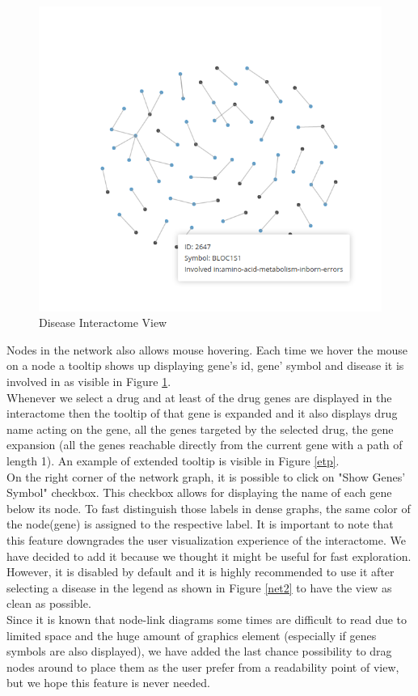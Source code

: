 \documentclass[12pt,twocolumn,twoside]{article}
\begin{document}
	\begin{figure}
		\includegraphics[width=.75\linewidth]{network.png}
		\caption{Disease Interactome View}
		\label{net}
	\end{figure}
	Nodes in the network also allows mouse hovering. Each time we hover the mouse on a node a tooltip shows up displaying gene's id, gene' symbol and disease it is involved in as visible in Figure \ref{net}.\\ Whenever we select a drug and at least of the drug genes are displayed in the interactome then the tooltip of that gene is expanded and it also displays drug name acting on the gene, all the genes targeted by the selected drug, the gene expansion (all the genes reachable directly from the current gene with a path of length 1). An example of extended tooltip is visible in Figure \ref{etp}.\\
	On the right corner of the network graph, it is possible to click on "Show Genes' Symbol" checkbox. This checkbox allows for displaying the name of each gene below its node. To fast distinguish those labels in dense graphs, the same color of the node(gene) is assigned to the respective label. It is important to note that this feature downgrades the user visualization experience of the interactome. We have decided to add it because we thought it might be useful for fast exploration. However, it is disabled by default and it is highly recommended to use it after selecting a disease in the legend as shown in Figure \ref{net2} to have the view as clean as possible.\\ 
	Since it is known that node-link diagrams some times are difficult to read due to limited space and the huge amount of graphics element (especially if genes symbols are also displayed), we have added the last chance possibility to drag nodes around to place them as the user prefer from a readability point of view, but we hope this feature is never needed.
	
\end{document}
